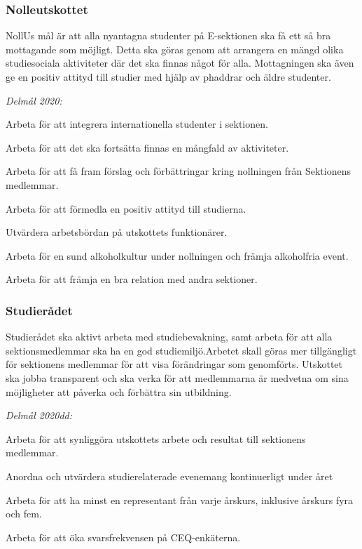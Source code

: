 \documentclass[../_main/handlingar.tex]{subfiles}
\begin{document}
\subsubsection*{Nolleutskottet}
NollUs mål är att alla nyantagna studenter på E-sektionen ska få ett så bra mottagande som möjligt. Detta ska göras genom att arrangera en mängd olika studiesociala aktiviteter där det ska finnas något för alla. Mottagningen ska även ge en positiv attityd till studier med hjälp av phaddrar och äldre studenter. 

\emph{Delmål 2020:}
\begin{dashlist}
	\item Arbeta för att integrera internationella studenter i sektionen. 
	\item Arbeta för att det ska fortsätta finnas en mångfald av aktiviteter.
	\item Arbeta för att få fram förslag och förbättringar kring nollningen från Sektionens medlemmar.
	\item Arbeta för att förmedla en positiv attityd till studierna.
	\item Utvärdera arbetsbördan på utskottets funktionärer.
	\item Arbeta för en sund alkoholkultur under nollningen och främja alkoholfria event.
	\item Arbeta för att främja en bra relation med andra sektioner.
\end{dashlist}

\subsubsection*{Studierådet}
Studierådet ska aktivt arbeta med studiebevakning, samt arbeta för att alla sektionsmedlemmar ska ha en god studiemiljö.Arbetet skall göras mer tillgängligt för sektionens medlemmar för att visa förändringar som genomförts. Utskottet ska jobba transparent och ska verka för att medlemmarna är medvetna  om sina möjligheter att påverka och förbättra sin utbildning.

\emph{Delmål 2020dd:}
\begin{dashlist}
	\item Arbeta för att synliggöra utskottets arbete och resultat till sektionens medlemmar.
	\item Anordna och utvärdera studierelaterade evenemang kontinuerligt under året
	\item Arbeta för att ha minst en representant från varje årskurs, inklusive årskurs fyra och fem.
	\item Arbeta för att öka svarsfrekvensen på CEQ-enkäterna.
\end{dashlist}

\newpage
\end{document}
